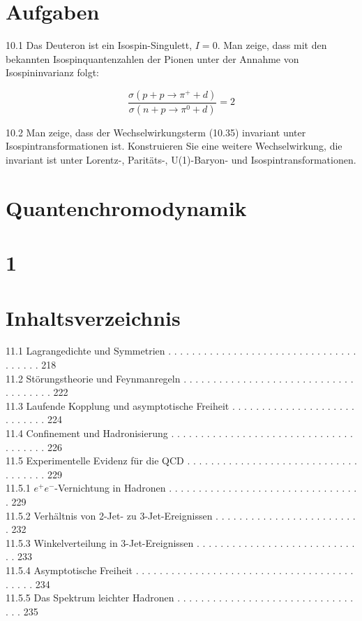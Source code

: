 \documentclass[10pt, letterpaper]{article}
\begin{document}
\section*{Aufgaben}
10.1 Das Deuteron ist ein Isospin-Singulett, $I=0$. Man zeige, dass mit den bekannten Isospinquantenzahlen der Pionen unter der Annahme von Isospininvarianz folgt:

$$
\frac{\sigma\left(p+p \rightarrow \pi^{+}+d\right)}{\sigma\left(n+p \rightarrow \pi^{0}+d\right)}=2
$$

10.2 Man zeige, dass der Wechselwirkungsterm (10.35) invariant unter Isospintransformationen ist. Konstruieren Sie eine weitere Wechselwirkung, die invariant ist unter Lorentz-, Paritäts-, U(1)-Baryon- und Isospintransformationen.

\section*{Quantenchromodynamik}
\section*{1}
\section*{Inhaltsverzeichnis}
11.1 Lagrangedichte und Symmetrien . . . . . . . . . . . . . . . . . . . . . . . . . . . . . . . . . . . . . . 218\\
11.2 Störungstheorie und Feynmanregeln . . . . . . . . . . . . . . . . . . . . . . . . . . . . . . . . . . . . . 222\\
11.3 Laufende Kopplung und asymptotische Freiheit . . . . . . . . . . . . . . . . . . . . . . . . . . . . 224\\
11.4 Confinement und Hadronisierung . . . . . . . . . . . . . . . . . . . . . . . . . . . . . . . . . . . . . . 226\\
11.5 Experimentelle Evidenz für die QCD . . . . . . . . . . . . . . . . . . . . . . . . . . . . . . . . . . . . 229\\
11.5.1 $e^{+} e^{-}$-Vernichtung in Hadronen . . . . . . . . . . . . . . . . . . . . . . . . . . . . . . . . . 229\\
11.5.2 Verhältnis von 2-Jet- zu 3-Jet-Ereignissen . . . . . . . . . . . . . . . . . . . . . . . . . 232\\
11.5.3 Winkelverteilung in 3-Jet-Ereignissen . . . . . . . . . . . . . . . . . . . . . . . . . . . . . 233\\
11.5.4 Asymptotische Freiheit . . . . . . . . . . . . . . . . . . . . . . . . . . . . . . . . . . . . . . . . . . 234\\
11.5.5 Das Spektrum leichter Hadronen . . . . . . . . . . . . . . . . . . . . . . . . . . . . . . . . . 235
\end{document}
